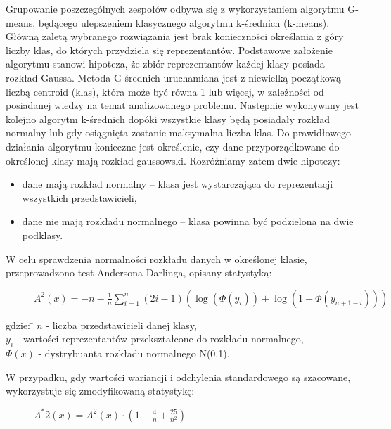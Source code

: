 Grupowanie poszczególnych zespołów odbywa się z wykorzystaniem algorytmu G-means, będącego ulepszeniem klasycznego algorytmu k-średnich (k-means). Główną zaletą wybranego rozwiązania jest brak konieczności określania z góry liczby klas, do których przydziela się reprezentantów.
\newline\newline Podstawowe założenie algorytmu stanowi hipoteza, że zbiór reprezentantów każdej klasy posiada rozkład Gaussa. Metoda G-średnich uruchamiana jest z niewielką początkową liczbą centroid (klas), która może być równa 1 lub więcej, w zależności od posiadanej wiedzy na temat analizowanego problemu. Następnie wykonywany jest kolejno algorytm k-średnich dopóki wszystkie klasy będą posiadały rozkład normalny lub gdy osiągnięta zostanie maksymalna liczba klas.
\newline\newline Do prawidłowego działania algorytmu konieczne jest określenie, czy dane przyporządkowane do określonej klasy mają rozkład gaussowski. Rozróżniamy zatem dwie hipotezy:
\begin{itemize}
\item dane mają rozkład normalny – klasa jest wystarczająca do reprezentacji wszystkich przedstawicieli,
\item dane nie mają rozkładu normalnego – klasa powinna być podzielona na dwie podklasy.
\end{itemize}
W celu sprawdzenia normalności rozkładu danych w określonej klasie, przeprowadzono test Andersona-Darlinga, opisany statystyką:\newline
\begin{figure}[h]
\centering
$A^2(x) = -n - \frac{1}{n}\sum\limits_{i=1}^n(2i-1)(\log(\Phi(y_{i})) + \log(1-\Phi(y_{n+1-i}))) $
\end{figure}
\begin{tabbing}
\newline gdzie: \= $n$ - liczba przedstawicieli danej klasy,\\
\> $y_{i}$ - wartości reprezentantów przekształcone do rozkładu normalnego,\\
\> $\Phi (x)$ - dystrybuanta rozkładu normalnego N(0,1).\\
\end{tabbing}

W przypadku, gdy wartości wariancji i odchylenia standardowego są szacowane, wykorzystuje się zmodyfikowaną statystykę:
\begin{figure}[h]
\centering
$A^*2(x) = A^2(x) \cdot (1+\frac{4}{n} +\frac{25}{n^2})  $
\end{figure}

